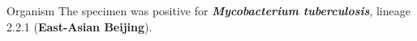 \documentclass[12pt]{article}
\begin{document}

\begin{reportSection}{Organism} %
\vspace{1mm}
The specimen was positive for \textit{\textbf{Mycobacterium tuberculosis}}, lineage 2.2.1 (\textbf{East-Asian Beijing}). %
\end{reportSection}
\vspace{5mm}

\end{document}
